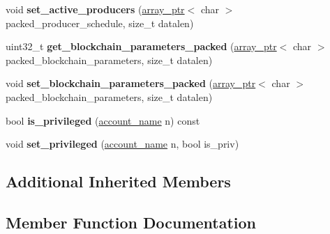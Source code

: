 \begin{DoxyCompactItemize}
void {\bfseries set\+\_\+active\+\_\+producers} (\mbox{\hyperlink{structaacio_1_1chain_1_1array__ptr}{array\+\_\+ptr}}$<$ char $>$ packed\+\_\+producer\+\_\+schedule, size\+\_\+t datalen)
\item 
\mbox{\label{classaacio_1_1chain_1_1privileged__api_ae1ab0edc450c649c93d4f24c1ed7743b}} 
uint32\+\_\+t {\bfseries get\+\_\+blockchain\+\_\+parameters\+\_\+packed} (\mbox{\hyperlink{structaacio_1_1chain_1_1array__ptr}{array\+\_\+ptr}}$<$ char $>$ packed\+\_\+blockchain\+\_\+parameters, size\+\_\+t datalen)
\item 
\mbox{\label{classaacio_1_1chain_1_1privileged__api_a5a34e45bca9e66ce5f1f4270624fca12}} 
void {\bfseries set\+\_\+blockchain\+\_\+parameters\+\_\+packed} (\mbox{\hyperlink{structaacio_1_1chain_1_1array__ptr}{array\+\_\+ptr}}$<$ char $>$ packed\+\_\+blockchain\+\_\+parameters, size\+\_\+t datalen)
\item 
\mbox{\label{classaacio_1_1chain_1_1privileged__api_a4a1bfe306e1c658b98b9813485b4d939}} 
bool {\bfseries is\+\_\+privileged} (\mbox{\hyperlink{structaacio_1_1chain_1_1name}{account\+\_\+name}} n) const
\item 
\mbox{\label{classaacio_1_1chain_1_1privileged__api_ace355fbaf5d9e152fde6e6ad004780e3}} 
void {\bfseries set\+\_\+privileged} (\mbox{\hyperlink{structaacio_1_1chain_1_1name}{account\+\_\+name}} n, bool is\+\_\+priv)
\end{DoxyCompactItemize}
\subsection*{Additional Inherited Members}


\subsection{Member Function Documentation}
\mbox{\label{classaacio_1_1chain_1_1privileged__api_adcddc159760da8de23a3223d5cecd47c}} 
